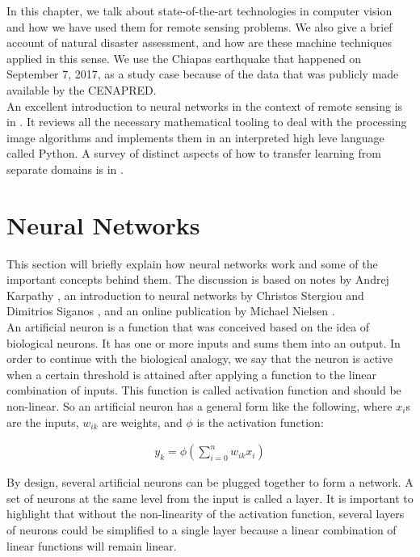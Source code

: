 In this chapter, we talk about state-of-the-art technologies in computer vision and how we have used them for remote sensing problems. We also give a brief account of natural disaster assessment, and how are these machine techniques applied in this sense. We use the Chiapas earthquake that happened on September 7, 2017, as a study case because of the data that was publicly made available by the CENAPRED.\\

An excellent introduction to neural networks in the context of remote sensing is in \cite{canty2014image}. It reviews all the necessary mathematical tooling to deal with the processing image algorithms and implements them in an interpreted high leve language called Python. A survey of distinct aspects of how to transfer learning from separate domains is in \cite{5288526}.\\


\section{Neural Networks}

This section will briefly explain how neural networks work and some of the important concepts behind them. The discussion is based on notes by Andrej Karpathy \cite{karpathy}, an introduction to neural networks by Christos Stergiou and Dimitrios Siganos \cite{stergiou}, and an online publication by Michael Nielsen \cite{nielsen}.\\

An artificial neuron is a function that was conceived based on the idea of biological neurons. It has one or more inputs and sums them into an output. In order to continue with the biological analogy, we say that the neuron is active when a certain threshold is attained after applying a function to the linear combination of inputs. This function is called activation function and should be non-linear. So an artificial neuron has a general form like the following, where $x_i$s are the inputs, $w_{ik}$ are weights, and $\phi$ is the activation function:

\begin{align}
y_k=\phi\left(\sum^n_{i=0}w_{ik}x_i\right)\nonumber
\end{align}

By design, several artificial neurons can be plugged together to form a network. A set of neurons at the same level from the input is called a layer. It is important to highlight that without the non-linearity of the activation function, several layers of neurons could be simplified to a single layer because a linear combination of linear functions will remain linear.\\

